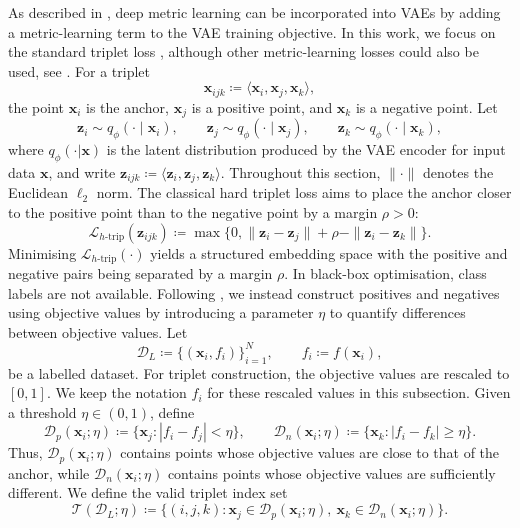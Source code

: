 \documentclass[pdflatex,sn-mathphys-num]{sn-jnl}%
\theoremstyle{thmstyleone}%
\theoremstyle{thmstyletwo}%
\theoremstyle{thmstylethree}%
\begin{document}
As described in \cite{grosnit2021highdimensionalbayesianoptimisationvariational, Ishfaq2018}, deep metric learning can be incorporated into VAEs by adding a metric-learning term to the VAE training objective. In this work, we focus on the standard triplet loss \cite{Hoffer2015}, although other metric-learning losses could also be used, see \cite{grosnit2021highdimensionalbayesianoptimisationvariational}. For a triplet
\[
    \mathbf x_{ijk}\coloneq\langle \mathbf x_i,\mathbf x_j,\mathbf x_k\rangle,
\]
the point \(\mathbf x_i\) is the anchor, \( \mathbf x_j\) is a positive point, and \(\mathbf x_k\) is a negative point. Let
\[
    \mathbf z_i\sim q_\phi(\cdot\mid \mathbf x_i), \qquad
    \mathbf z_j\sim q_\phi(\cdot\mid \mathbf x_j), \qquad
    \mathbf z_k\sim q_\phi(\cdot\mid \mathbf x_k),
\]
where $q_\phi(\cdot|\mathbf x)$ is the latent distribution produced by the VAE encoder for input data $\mathbf x$, and write \(\mathbf z_{ijk}\coloneq\langle \mathbf z_i,\mathbf z_j,\mathbf z_k\rangle\). Throughout this section, \(\|\cdot\|\) denotes the Euclidean $\ell_2$ norm. The classical hard triplet loss aims to place the anchor closer to the positive point than to the negative point by a margin \(\rho>0\):
\[
    \mathcal L_{h\text{-trip}}(\mathbf z_{ijk})
    \coloneq
    \max\{0,\|\mathbf z_i- \mathbf z_j\|+\rho-\| \mathbf z_i- \mathbf z_k\|\}.
\]
Minimising $\mathcal{L}_{h\text{-trip}} (\cdot)$ yields a structured embedding space with the positive and negative pairs being separated by a margin $\rho$. In black-box optimisation, class labels are not available. Following \cite{grosnit2021highdimensionalbayesianoptimisationvariational}, we instead construct positives and negatives using objective values by introducing a parameter $\eta$ to quantify differences between objective values. Let
\[
    \mathcal D_L\coloneq\{(\mathbf x_i,f_i)\}_{i=1}^N, \qquad f_i \coloneq f(\mathbf x_i),
\]
be a labelled dataset. For triplet construction, the objective values are rescaled to \([0,1]\). We keep the notation \(f_i\) for these rescaled values in this subsection. Given a threshold \(\eta\in(0,1)\), define
\[
    \mathcal D_p(\mathbf x_i;\eta)
    \coloneq
    \{\mathbf x_j : |f_i-f_j|<\eta\},
\qquad 
    \mathcal D_n(\mathbf x_i;\eta)
    \coloneq
    \{\mathbf x_k : |f_i-f_k|\geq \eta\}.
\]
Thus, \(\mathcal D_p( \mathbf x_i;\eta)\) contains points whose objective values are close to that of the anchor, while \(\mathcal D_n(\mathbf x_i;\eta)\) contains points whose objective values are sufficiently different. We define the valid triplet index set
\[
    \mathcal T(\mathcal D_L;\eta)
    \coloneq
    \{(i,j,k): \mathbf x_j\in \mathcal D_p(\mathbf x_i;\eta),\ \mathbf x_k\in \mathcal D_n(\mathbf x_i;\eta)\}.
\]
\end{document}

